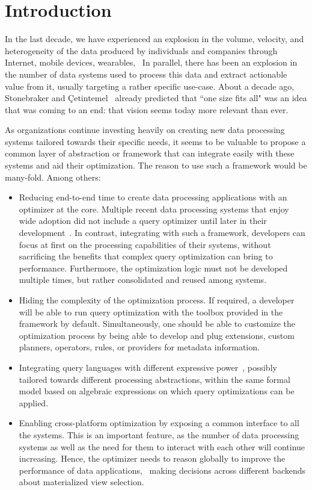 \section{Introduction}
\label{sec:intro}

In the last decade, we have experienced an explosion in the volume, velocity, and heterogeneity of the data produced by individuals and companies through Internet, mobile devices, wearables, \etc\ In parallel, there has been an explosion in the number of data systems used to process this data and extract actionable value from it, usually targeting a rather specific use-case. About a decade ago, Stonebraker and \c{C}etintemel~\cite{DBLP:conf/icde/StonebrakerC05} already predicted that ``one size fits all" was an idea that was coming to an end: that vision seems today more relevant than ever.

As organizations continue investing heavily on creating new data processing systems tailored towards their specific needs, it seems to be valuable to propose a common layer of abstraction or framework that can integrate easily with these systems and aid their optimization. The reason to use such a framework would be many-fold. Among others:

\begin{itemize}
	\item Reducing end-to-end time to create data processing applications with an optimizer at the core. Multiple recent data processing systems that enjoy wide adoption did not include a query optimizer until later in their development~\cite{DBLP:conf/sigmod/ArmbrustXLHLBMK15,DBLP:conf/sigmod/HuaiCGHHOPYL014}. In contrast, integrating with such a framework, developers can focus at first on the processing capabilities of their systems, without sacrificing the benefits that complex query optimization can bring to performance. Furthermore, the optimization logic must not be developed multiple times, but rather consolidated and reused among systems.
	\item Hiding the complexity of the optimization process. If required, a developer will be able to run query optimization with the toolbox provided in the framework by default. Simultaneously, one should be able to customize the optimization process by being able to develop and plug extensions, \eg custom planners, operators, rules, or providers for metadata information.
	\item Integrating query languages with different expressive power~\cite{DBLP:journals/cacm/Hyde10,DBLP:conf/sigmod/MeijerBB06}, possibly tailored towards different processing abstractions, within the same formal model based on algebraic expressions on which query optimizations can be applied.
	\item Enabling cross-platform optimization by exposing a common interface to all the systems. This is an important feature, as the number of data processing systems as well as the need for them to interact with each other will continue increasing. Hence, the optimizer needs to reason globally to improve the performance of data applications, \eg\ making decisions across different backends about materialized view selection.
\end{itemize}

